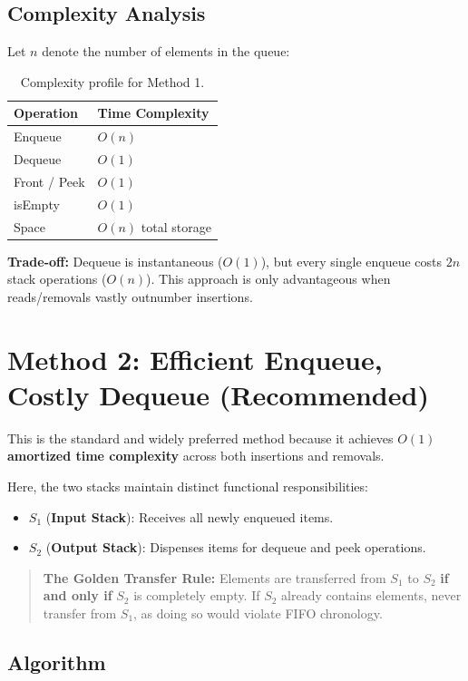 \subsection{Complexity Analysis}
Let $n$ denote the number of elements in the queue:
\begin{table}[htbp]
\centering
\small
\begin{tabularx}{0.7\textwidth}{l X}
\toprule
\textbf{Operation} & \textbf{Time Complexity} \\
\midrule
Enqueue      & $O(n)$ \\
Dequeue      & $O(1)$ \\
Front / Peek & $O(1)$ \\
isEmpty      & $O(1)$ \\
Space        & $O(n)$ total storage \\
\bottomrule
\end{tabularx}
\caption{Complexity profile for Method 1.}
\end{table}

\textbf{Trade-off:} Dequeue is instantaneous ($O(1)$), but every single enqueue costs $2n$ stack operations ($O(n)$). This approach is only advantageous when reads/removals vastly outnumber insertions.

\section{Method 2: Efficient Enqueue, Costly Dequeue (Recommended)}

This is the standard and widely preferred method because it achieves \textbf{$O(1)$ amortized time complexity} across both insertions and removals.

Here, the two stacks maintain distinct functional responsibilities:
\begin{itemize}
    \item $S_1$ (\textbf{Input Stack}): Receives all newly enqueued items.
    \item $S_2$ (\textbf{Output Stack}): Dispenses items for dequeue and peek operations.
\end{itemize}

\begin{quote}
\textbf{The Golden Transfer Rule:} Elements are transferred from $S_1$ to $S_2$ \textbf{if and only if} $S_2$ is completely empty. If $S_2$ already contains elements, never transfer from $S_1$, as doing so would violate FIFO chronology.
\end{quote}

\subsection{Algorithm}

